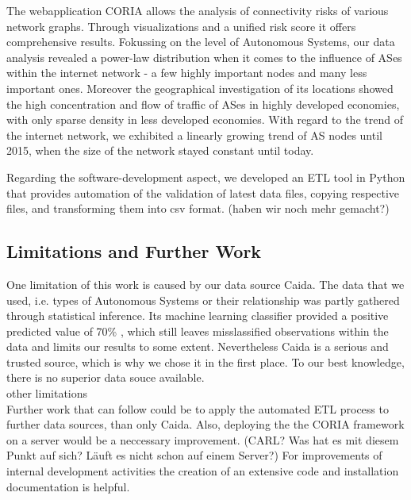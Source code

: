 \documentclass[conference, 11pt]{IEEEtran}
\begin{document}
The webapplication CORIA allows the analysis of connectivity risks of various network graphs. Through visualizations and a unified risk score it offers comprehensive results. Fokussing on the level of Autonomous Systems, our data analysis revealed a power-law distribution when it comes to the influence of ASes within the internet network - a few highly important nodes and many less important ones. Moreover the geographical investigation of its locations showed the high concentration and flow of traffic of ASes in highly developed economies, with only sparse density in less developed economies. With regard to the trend of the internet network, we exhibited a linearly growing trend of AS nodes until 2015, when the size of the network stayed constant until today.

Regarding the software-development aspect, we developed an ETL tool in Python that provides automation of the validation of latest data files, copying respective files, and transforming them into csv format.  (haben wir noch mehr gemacht?)

 

\subsection{Limitations and Further Work}

 
One limitation of this work is caused by our data source Caida. The data that we used, i.e. types of Autonomous Systems or their relationship was partly gathered through statistical inference. Its machine learning classifier provided a positive predicted value of 70\% \cite{Classification}, which still leaves misslassified observations within the data and limits our results to some extent. Nevertheless Caida is a serious and trusted source, which is why we chose it in the first place. To our best knowledge, there is no superior data souce available.  \\ 

other limitations\\



Further work that can follow could be to apply the automated ETL process to further data sources, than only Caida. Also, deploying the the CORIA framework on a server would be a neccessary improvement. (CARL? Was hat es mit diesem Punkt auf sich? Läuft es nicht schon auf einem Server?) For improvements of internal development activities the creation of an extensive code and installation documentation is helpful.
\end{document}
